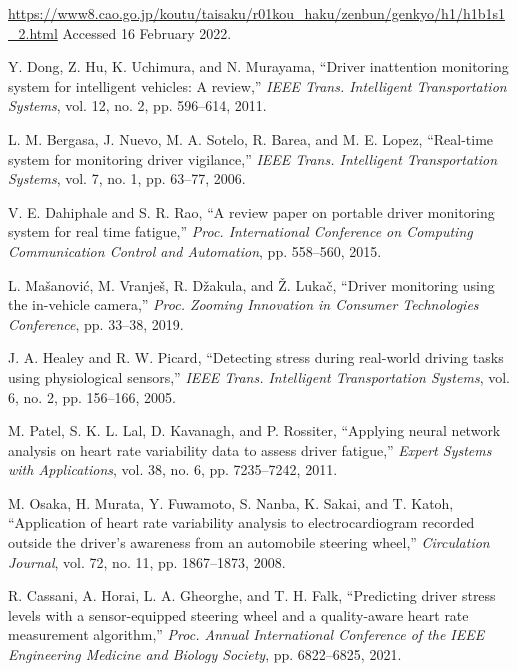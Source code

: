 \documentclass[honka]{nitkagawathesis}%
\begin{document}
\begin{thebibliography}{99}
    \url{https://www8.cao.go.jp/koutu/taisaku/r01kou_haku/zenbun/genkyo/h1/h1b1s1_2.html} Accessed 16 February 2022.

  Y. Dong, Z. Hu, K. Uchimura, and N. Murayama, ``Driver inattention monitoring system for intelligent vehicles: A review,'' {\em IEEE Trans. Intelligent Transportation 
  Systems}, vol.           
  12, no. 2, pp. 596--614, 2011.

  L. M. Bergasa, J. Nuevo, M. A. Sotelo, R. Barea, and M. E. Lopez, ``Real-time system for monitoring driver vigilance,'' {\em IEEE Trans. Intelligent Transportation 
  Systems}, vol. 7, no. 
  1, pp. 63--77, 2006.

  V. E. Dahiphale and S. R. Rao, ``A review paper on portable driver monitoring system for real time fatigue,'' {\em Proc. International Conference on Computing 
  Communication 
  Control and Automation}, pp. 558--560, 2015.

  L. Ma\v{s}anovi\'{c}, M. Vranje\v{s}, R. D\v{z}akula, and \v{Z}. Luka\v{c}, ``Driver monitoring using the in-vehicle camera,'' {\em Proc. Zooming Innovation in 
  Consumer Technologies Conference}, pp. 
  33--38, 2019.

  J. A. Healey and R. W. Picard, ``Detecting stress during real-world driving tasks using physiological sensors,'' {\em IEEE Trans. Intelligent Transportation Systems}, 
  vol. 6, no. 2, pp. 156--166, 2005.

  M. Patel, S. K. L. Lal, D. Kavanagh, and P. Rossiter, ``Applying neural network analysis on heart rate variability data to assess driver fatigue,'' {\em Expert Systems 
  with Applications}, vol. 38, no. 6, pp. 7235--7242, 2011.

  M. Osaka, H. Murata, Y. Fuwamoto, S. Nanba, K. Sakai, and T. Katoh, ``Application of heart rate variability analysis to electrocardiogram recorded outside the driver's 
  awareness from an automobile steering wheel,'' {\em Circulation Journal}, vol. 72, no. 11, pp. 1867--1873, 2008.

  R. Cassani, A. Horai, L. A. Gheorghe, and T. H. Falk, ``Predicting driver stress levels with a sensor-equipped steering wheel and a quality-aware heart rate 
  measurement algorithm,'' {\em Proc. Annual International Conference of the IEEE Engineering Medicine and Biology Society}, pp. 6822--6825, 2021.


\end{thebibliography}
\end{document}
